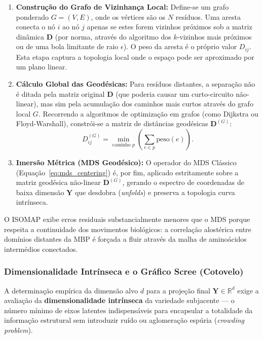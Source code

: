 \documentclass[12pt, a4paper]{article}
\begin{document}
\begin{enumerate}
    \item \textbf{Construção do Grafo de Vizinhança Local:} Define-se um grafo ponderado $G = (V, E)$, onde os vértices são os $N$ resíduos. Uma aresta conecta o nó $i$ ao nó $j$ apenas se estes forem vizinhos próximos sob a matriz dinâmica $\mathbf{D}$ (por norma, através do algoritmo dos $k$-vizinhos mais próximos ou de uma bola limitante de raio $\epsilon$). O peso da aresta é o próprio valor $D_{ij}$. Esta etapa captura a topologia local onde o espaço pode ser aproximado por um plano linear.
    \item \textbf{Cálculo Global das Geodésicas:} Para resíduos distantes, a separação não é ditada pela matriz original $\mathbf{D}$ (que poderia causar um curto-circuito não-linear), mas sim pela acumulação dos caminhos mais curtos através do grafo local $G$. Recorrendo a algoritmos de optimização em grafos (como Dijkstra ou Floyd-Warshall), constrói-se a matriz de distâncias geodésicas $\mathbf{D}^{(G)}$:
    \begin{equation*}\label{eq:geodesica}
    D^{(G)}_{ij} = \min_{\text{caminho } p} \left( \sum_{e \in p} \text{peso}(e) \right).
    \end{equation*}
    \item \textbf{Imersão Métrica (MDS Geodésico):} O operador do MDS Clássico (Equação~\ref{eq:mds_centering}) é, por fim, aplicado estritamente sobre a matriz geodésica não-linear $\mathbf{D}^{(G)}$, gerando o espectro de coordenadas de baixa dimensão $\mathbf{Y}$ que desdobra (\textit{unfolds}) e preserva a topologia curva intrínseca.
\end{enumerate}

O ISOMAP exibe erros residuais substancialmente menores que o MDS porque respeita a continuidade dos movimentos biológicos: a correlação alostérica entre domínios distantes da MBP é forçada a fluir através da malha de aminoácidos intermédios conectados.

\subsubsection{Dimensionalidade Intrínseca e o Gráfico Scree (Cotovelo)}

A determinação empírica da dimensão alvo $d$ para a projeção final $\mathbf{Y} \in \mathbb{R}^d$ exige a avaliação da \textbf{dimensionalidade intrínseca} da variedade subjacente — o número mínimo de eixos latentes indispensáveis para encapsular a totalidade da informação estrutural sem introduzir ruído ou aglomeração espúria (\textit{crowding problem}).
\end{document}
